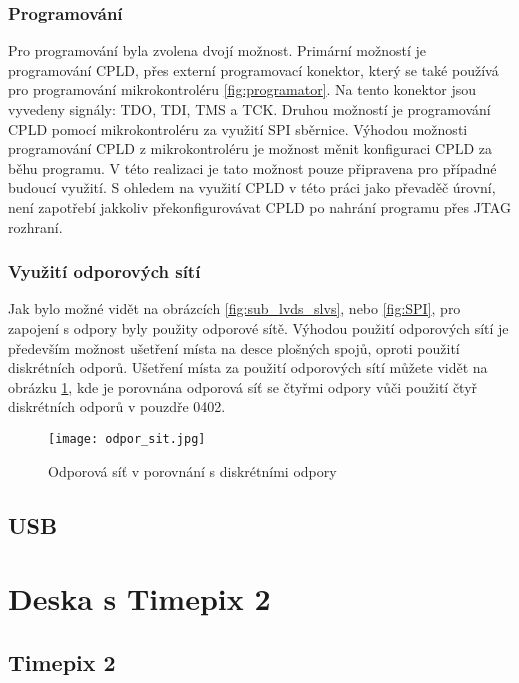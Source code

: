 	\subsubsection{Programování}
	Pro programování byla zvolena dvojí možnost. Primární možností je programování CPLD, přes externí programovací konektor, který se také používá pro programování mikrokontroléru \ref{fig:programator}. Na tento konektor jsou vyvedeny signály: TDO, TDI, TMS a TCK. Druhou možností je programování CPLD pomocí mikrokontroléru za využití SPI sběrnice. Výhodou možnosti programování CPLD z mikrokontroléru je možnost měnit konfiguraci CPLD za běhu programu. V této realizaci je tato možnost pouze připravena pro  případné budoucí využití. S ohledem na využití CPLD v této práci jako převaděč úrovní, není zapotřebí jakkoliv překonfigurovávat CPLD po nahrání programu přes JTAG rozhraní.
	\subsubsection{Využití odporových sítí} %
	Jak bylo možné vidět na obrázcích \ref{fig:sub_lvds_slvs}, nebo \ref{fig:SPI}, pro zapojení s odpory byly použity odporové sítě. Výhodou použití odporových sítí je především možnost ušetření místa na desce plošných spojů, oproti použití diskrétních odporů. Ušetření místa za použití odporových sítí můžete vidět na obrázku \ref{fig:odpor_sit}, kde je porovnána odporová síť se čtyřmi odpory vůči použití čtyř diskrétních odporů v pouzdře 0402.
	\begin{figure}[h!]
		\centering
		\captionsetup{justification=centering}
		\texttt{[image: odpor\_sit.jpg]}
		\caption{Odporová síť v porovnání s diskrétními odpory} 
		\label{fig:odpor_sit}
	\end{figure}
	
	\subsection{USB} %
	\label{USB}

\section{Deska s Timepix 2}
	\subsection{Timepix 2}	%
